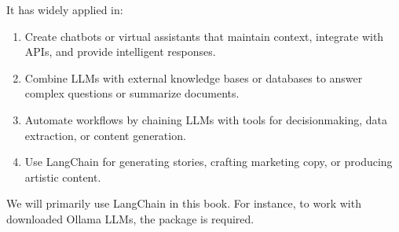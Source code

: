 \documentclass[letterpaper,11pt,english]{sphinxmanual}
\begin{document}
\sphinxAtStartPar
It has widely applied in:
\begin{enumerate}
%
\item {} 
\sphinxAtStartPar
{}
Create chatbots or virtual assistants that maintain context, integrate with APIs, and provide intelligent responses.

\item {} 
\sphinxAtStartPar
{}
Combine LLMs with external knowledge bases or databases to answer complex questions or summarize documents.

\item {} 
\sphinxAtStartPar
{}
Automate workflows by chaining LLMs with tools for decision\sphinxhyphen{}making, data extraction, or content generation.

\item {} 
\sphinxAtStartPar
{}
Use LangChain for generating stories, crafting marketing copy, or producing artistic content.

\end{enumerate}

\sphinxAtStartPar
We will primarily use LangChain in this book. For instance, to work with downloaded Ollama LLMs, the 
package is required.
\end{document}
